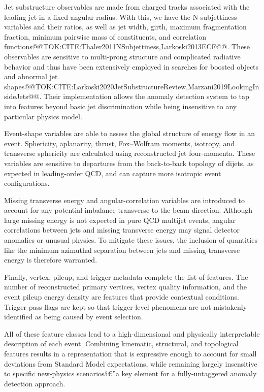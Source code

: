 \documentclass[11pt]{article}
\begin{document}
Jet substructure observables are made from charged tracks associated with the leading jet in a fixed angular radius. With this, we have the N-subjettiness variables and their ratios, as well as jet width, girth, maximum fragmentation fraction, minimum pairwise mass of constituents, and correlation functions@@TOK:CITE:Thaler2011NSubjettiness,Larkoski2013ECF@@. These observables are sensitive to multi-prong structure and complicated radiative behavior and thus have been extensively employed in searches for boosted objects and abnormal jet shapes@@TOK:CITE:Larkoski2020JetSubstructureReview,Marzani2019LookingInsideJets@@. Their implementation allows the anomaly detection system to tap into features beyond basic jet discrimination while being insensitive to any particular physics model.

Event-shape variables are able to assess the global structure of energy flow in an event. Sphericity, aplanarity, thrust, Fox--Wolfram moments, isotropy, and transverse sphericity are calculated using reconstructed jet four-momenta. These variables are sensitive to departures from the back-to-back topology of dijets, as expected in leading-order QCD, and can capture more isotropic event configurations.

Missing transverse energy and angular-correlation variables are introduced to account for any potential imbalance transverse to the beam direction. Although large missing energy is not expected in pure QCD multijet events, angular correlations between jets and missing transverse energy may signal detector anomalies or unusual physics. To mitigate these issues, the inclusion of quantities like the minimum azimuthal separation between jets and missing transverse energy is therefore warranted.

Finally, vertex, pileup, and trigger metadata complete the list of features. The number of reconstructed primary vertices, vertex quality information, and the event pileup energy density are features that provide contextual conditions. Trigger pass flags are kept so that trigger-level phenomena are not mistakenly identified as being caused by event selection.

All of these feature classes lead to a high-dimensional and physically interpretable description of each event. Combining kinematic, structural, and topological features results in a representation that is expressive enough to account for small deviations from Standard Model expectations, while remaining largely insensitive to specific new-physics scenariosâ€”a key element for a fully-untaggered anomaly detection approach.
\end{document}
